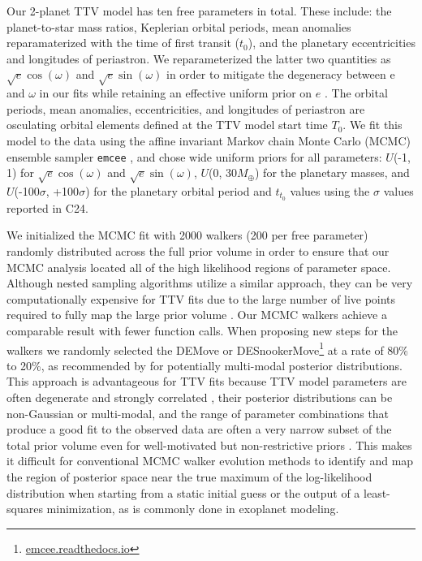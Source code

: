 \documentclass[twocolumn]{aastex631}
\begin{document}
Our 2-planet TTV model has ten free parameters in total. These include: the planet-to-star mass ratios, Keplerian orbital periods, mean anomalies reparamaterized with the time of first transit ($t_0$), and the planetary eccentricities and longitudes of periastron.  We reparameterized the latter two quantities as $\sqrt{e}\cos(\omega)$ and $\sqrt{e}\sin(\omega)$ in order to mitigate the degeneracy between e and $\omega$ in our fits while retaining an effective uniform prior on $e$ \citep{exofast}. The orbital periods, mean anomalies, eccentricities, and longitudes of periastron are osculating orbital elements defined at the TTV model start time $T_0$. We fit this model to the data using the affine invariant Markov chain Monte Carlo (MCMC) ensemble sampler \texttt{emcee} \citep{emcee}, and chose wide uniform priors for all parameters: $\textit{U}$(-1, 1) for $\sqrt{e}\cos(\omega)$ and $\sqrt{e}\sin(\omega)$, $\textit{U}$(0, 30$M_{\oplus}$) for the planetary masses, and $\textit{U}$(-100$\sigma$, +100$\sigma$) for the planetary orbital period and $t_{t_0}$ values using the $\sigma$ values reported in C24.

We initialized the MCMC fit with 2000 walkers (200 per free parameter) randomly distributed across the full prior volume in order to ensure that our MCMC analysis located all of the high likelihood regions of parameter space.  Although nested sampling algorithms utilize a similar approach, they can be very computationally expensive for TTV fits due to the large number of live points required to fully map the large prior volume \citep{dynesty,nestcheck}. Our MCMC walkers achieve a comparable result with fewer function calls.  When proposing new steps for the walkers we randomly selected the DEMove \citep{DEMove} or DESnookerMove\footnote{\href{https://emcee.readthedocs.io/en/stable/user/moves/}{emcee.readthedocs.io}} \citep{SnookerMove} at a rate of 80\% to 20\%, as recommended by \cite{ForemanMackey2019} for potentially multi-modal posterior distributions. This approach is advantageous for TTV fits because TTV model parameters are often degenerate and strongly correlated \citep[e.g., in mass and eccentricity,][]{Lithwick_2012}, their posterior distributions can be non-Gaussian or multi-modal, and the range of parameter combinations that produce a good fit to the observed data are often a very narrow subset of the total prior volume even for well-motivated but non-restrictive priors \citep[e.g.,][]{TOI-1136}. This makes it difficult for conventional MCMC walker evolution methods to identify and map the region of posterior space near the true maximum of the log-likelihood distribution when starting from a static initial guess or the output of a least-squares minimization, as is commonly done in exoplanet modeling. 
\end{document}
